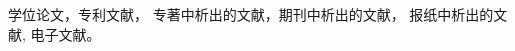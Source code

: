 \documentclass[12pt,a4paper,oneside]{ctexart}
\begin{document}
	
	
	
	
	
	\setcounter{page}{1}

	\tableofcontents

	\newpage
	

	

	
	学位论文\cite{Zhang1998}，专利文献\parencite{Jiang1989,HBLZ2001}，
	专著中析出的文献\cite{Cheng1999,GBT2659}，期刊中析出的文献\parencite{Li1999,Li2000}，
	报纸中析出的文献\cite{Ding2000}, 电子文献\parencite{Jiang1999,Christine1998,Xiao2001}。

	\printbibliography[heading=bibintoc,title={参考文献}]

	
	

	
\end{document}
